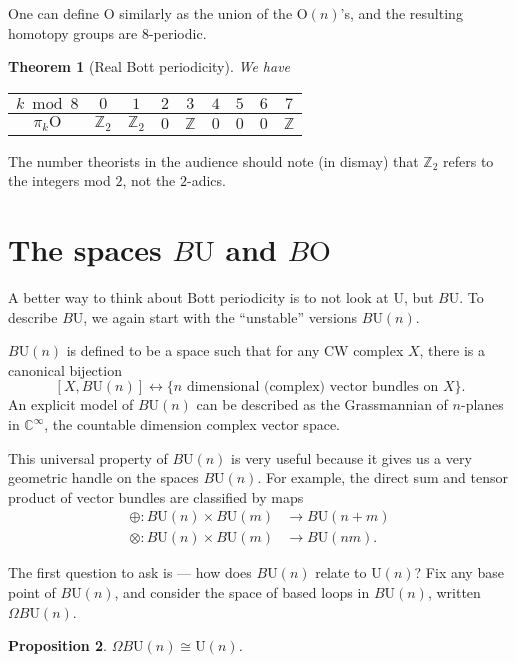 \documentclass{shortart}
\newtheorem{thm}{Theorem}
\newtheorem{prop}[thm]{Proposition}
\theoremstyle{definition}
\newcommand\U{\mathrm{U}}
\newcommand\BU{B\mathrm{U}}
\newcommand\Z{\mathbb{Z}}
\renewcommand\O{\mathrm{O}}
\newcommand\BO{B\mathrm{O}}
\newcommand\C{\mathbb{C}}
\begin{document}
One can define $\O$ similarly as the union of the $\O(n)$'s, and the resulting homotopy groups are $8$-periodic.
\begin{thm}[Real Bott periodicity]
  We have
  \begin{center}
    \begin{tabular}{ccccccccc}
      \toprule
      $k \bmod 8$ & $0$ & $1$ & $2$ & $3$ & $4$ &$5$ & $6$ &$7$\\
      \midrule
      $\pi_k \O$ & $\Z_2$ & $\Z_2$ & $0$ & $\Z$ & $0$ & $0$ & $0$ & $\Z$\\
      \bottomrule
    \end{tabular}
  \end{center}
\end{thm}
The number theorists in the audience should note (in dismay) that $\Z_2$ refers to the integers mod $2$, not the $2$-adics.

\section{The spaces \texorpdfstring{$\BU$}{BU} and \texorpdfstring{$\BO$}{BO}}
A better way to think about Bott periodicity is to not look at $\U$, but $\BU$.  To describe $\BU$, we again start with the ``unstable'' versions $\BU(n)$.

$\BU(n)$ is defined to be a space such that for any CW complex $X$, there is a canonical bijection
\[
  [X, \BU(n)] \leftrightarrow \Big\{\text{$n$ dimensional (complex) vector bundles on $X$}\Big\}.
\]
An explicit model of $\BU(n)$ can be described as the Grassmannian of $n$-planes in $\C^\infty$, the countable dimension complex vector space.

This universal property of $\BU(n)$ is very useful because it gives us a very geometric handle on the spaces $\BU(n)$. For example, the direct sum and tensor product of vector bundles are classified by maps
\[
  \begin{aligned}
    \oplus: \BU(n) \times \BU(m) &\to \BU(n + m)\\
    \otimes: \BU(n) \times \BU(m) &\to \BU(nm).
  \end{aligned}
\]

The first question to ask is --- how does $\BU(n)$ relate to $\U(n)$? Fix any base point of $\BU(n)$, and consider the space of based loops in $\BU(n)$, written $\Omega \BU(n)$.

\begin{prop}
  $\Omega \BU(n) \cong \U(n)$.
\end{prop}
\end{document}
